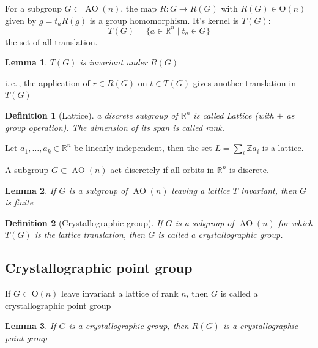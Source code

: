 \documentclass{amsart}
\newtheorem{definition}{Definition}
\newtheorem{lemma}{Lemma}
\DeclareMathOperator{\AO}{AO}
\begin{document}
\vspace{10pt} %

For a subgroup $G\subset \AO(n)$, the map $R\colon G \to R(G)$ with $R(G)\in \text{O}(n)$ given by
$g = t_a R(g)$ is a group homomorphism. It's kernel is $T(G)$:
\begin{equation}
    T(G) = \{ a \in \mathbb{R}^n \mid t_a \in G\}
\end{equation}
the set of all translation. 

\begin{lemma}
    $T(G)$ is invariant under $R(G)$
\end{lemma}
i.\,e.\,, the application of $r\in R(G)$ on $t\in T(G)$ gives another translation in $T(G)$

\vspace{10pt} %

\begin{definition}
    [Lattice]
    a discrete subgroup of $\mathbb{R}^n$ is called Lattice (with $+$ as group operation). The dimension of its span is called rank.
\end{definition}
Let $a_1,\dots,a_k \in \mathbb{R}^n$ be linearly independent, then the set 
$L = \sum_i \mathbb{Z} a_i$ is a lattice.

A subgroup $G\subset \AO(n)$ act discretely if all orbits in $\mathbb{R}^n$ is discrete.

\begin{lemma}
    If $G$ is a subgroup of $\AO(n)$ leaving a lattice $T$ invariant, then $G$ is finite
\end{lemma}

\begin{definition}
    [Crystallographic group]
    If $G$ is a subgroup of $\AO(n)$ for which $T(G)$ is the lattice translation, then $G$ is called 
    a crystallographic group.
\end{definition}
\subsection*{Crystallographic point group}
If $G\subset \text{O}(n)$ leave invariant a lattice of rank $n$, then $G$ is called a crystallographic point group

\begin{lemma}
    If $G$ is a crystallographic group, then $R(G)$ is a crystallographic point group
\end{lemma}


\newpage
\end{document}

